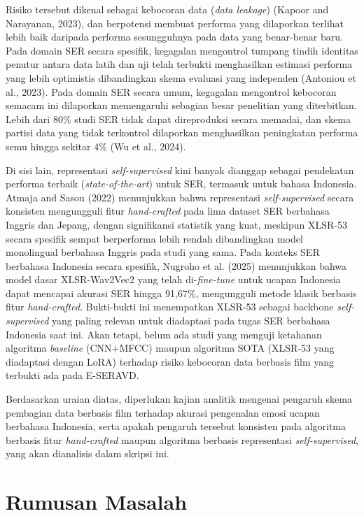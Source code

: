 Risiko tersebut
dikenal sebagai kebocoran data (\emph{data leakage}) (Kapoor and
Narayanan, 2023), dan berpotensi membuat performa yang dilaporkan
terlihat lebih baik daripada performa sesungguhnya pada data yang
benar-benar baru. Pada domain SER secara spesifik, kegagalan mengontrol
tumpang tindih identitas penutur antara data latih dan uji telah
terbukti menghasilkan estimasi performa yang lebih optimistis
dibandingkan skema evaluasi yang independen (Antoniou et al., 2023). Pada domain SER
secara umum, kegagalan mengontrol kebocoran semacam ini dilaporkan
memengaruhi sebagian besar penelitian yang diterbitkan. Lebih dari
80\% studi SER tidak dapat direproduksi secara memadai, dan skema
partisi data yang tidak terkontrol dilaporkan menghasilkan peningkatan
performa semu hingga sekitar 4\% (Wu et al., 2024).

Di sisi lain, representasi \emph{self-supervised} kini banyak dianggap
sebagai pendekatan performa terbaik (\emph{state-of-the-art}) untuk SER,
termasuk untuk bahasa Indonesia. Atmaja and Sasou (2022) menunjukkan
bahwa representasi \emph{self-supervised} secara konsisten mengungguli
fitur \emph{hand-crafted} pada lima dataset SER berbahasa Inggris dan Jepang, dengan
signifikansi statistik yang kuat, meskipun
XLSR-53 secara spesifik sempat berperforma lebih rendah dibandingkan
model monolingual berbahasa Inggris pada studi yang sama. Pada konteks
SER berbahasa Indonesia secara spesifik, Nugroho et al. (2025)
menunjukkan bahwa model dasar XLSR-Wav2Vec2 yang telah di-\emph{fine-tune}
untuk ucapan Indonesia dapat mencapai akurasi SER hingga 91,67\%,
mengungguli metode klasik berbasis fitur \emph{hand-crafted}. Bukti-bukti ini
menempatkan XLSR-53 sebagai backbone \emph{self-supervised} yang paling
relevan untuk diadaptasi pada tugas SER berbahasa Indonesia saat ini. Akan tetapi, belum
ada studi yang menguji ketahanan algoritma \emph{baseline} (CNN+MFCC)
maupun algoritma SOTA (XLSR-53 yang diadaptasi dengan LoRA) terhadap
risiko kebocoran data berbasis film yang terbukti ada pada E-SERAVD.

Berdasarkan uraian diatas,
diperlukan kajian analitik mengenai pengaruh skema pembagian data
berbasis film terhadap akurasi pengenalan emosi ucapan berbahasa
Indonesia, serta apakah pengaruh tersebut konsisten pada algoritma
berbasis fitur \emph{hand-crafted} maupun algoritma berbasis representasi
\emph{self-supervised},
yang akan dianalisis dalam skripsi ini.

\section{Rumusan Masalah}
\label{sec:1.2}

